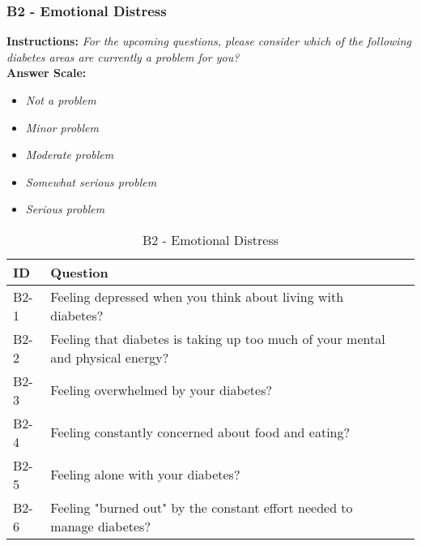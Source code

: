 \subsubsection{B2 - Emotional Distress}
\textbf{Instructions:} \emph{For the upcoming questions, please consider which of the following diabetes areas are currently a problem for you?}
\\
\textbf{Answer Scale:}
\begin{itemize}
    \item \emph{Not a problem}
    \item \emph{Minor problem}
    \item \emph{Moderate problem}
    \item \emph{Somewhat serious problem}
    \item \emph{Serious problem}
\end{itemize}
\begin{table}[H]
    \centering
    \renewcommand{\arraystretch}{1.2}
    \begin{tabularx}{\textwidth}{|l|X|l|}
        \hline
        \textbf{ID} & \textbf{Question} \\ \hline
        B2-1 & Feeling depressed when you think about living with diabetes? \\ \hline
        B2-2 & Feeling that diabetes is taking up too much of your mental and physical energy? \\ \hline
        B2-3 & Feeling overwhelmed by your diabetes? \\ \hline
        B2-4 & Feeling constantly concerned about food and eating? \\ \hline
        B2-5 & Feeling alone with your diabetes? \\ \hline
        B2-6 & Feeling "burned out" by the constant effort needed to manage diabetes? \\ \hline
    \end{tabularx}
    \caption{B2 - Emotional Distress}
    \label{tab:emotional-distress}
\end{table}


